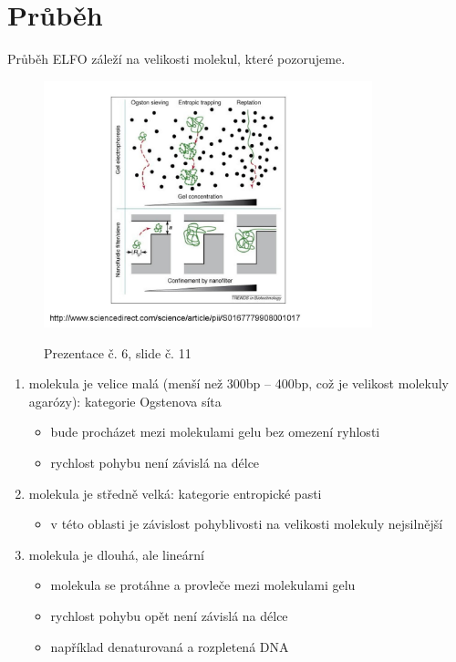 \documentclass[DIV=8]{scrreprt}
\begin{document}
\section{Průběh} \label{Průběh}


Průběh ELFO záleží na velikosti molekul, které pozorujeme.
\begin{figure}
    \caption{Prezentace č. 6, slide č. 11}
    \includegraphics[width=0.85\textwidth]{slides-6/slide-11.jpg}
    \centering
    \label{slides-6-slide-11}
\end{figure}

\begin{enumerate}[nosep]
    \item molekula je velice malá (menší než 300bp -- 400bp, což je velikost molekuly agarózy): kategorie Ogstenova síta
\begin{itemize}[nosep]
    \item bude procházet mezi molekulami gelu bez omezení ryhlosti
    \item rychlost pohybu není závislá na délce
\end{itemize}

    \item molekula je středně velká: kategorie entropické pasti
\begin{itemize}[nosep]
    \item v této oblasti je závislost pohyblivosti na velikosti molekuly nejsilnější
\end{itemize}

    \item molekula je dlouhá, ale lineární
\begin{itemize}[nosep]
    \item molekula se protáhne a provleče mezi molekulami gelu
    \item rychlost pohybu opět není závislá na délce
    \item například denaturovaná a rozpletená DNA
\end{itemize}

\end{enumerate}
\end{document}
